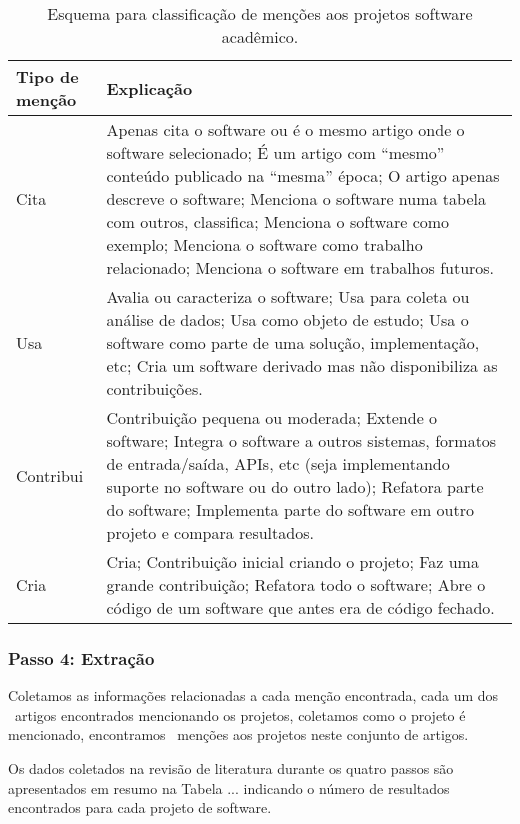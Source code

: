 \begin{table}[h]
\caption{Esquema para classificação de menções aos projetos software acadêmico.}
\centering
\begin{tabular}{ l p{10cm} }
  \hline
  Tipo de menção           & Explicação \\
  \hline
  Cita      & Apenas cita o software ou é o mesmo artigo onde o software selecionado; É um artigo com ``mesmo'' conteúdo publicado na ``mesma'' época; O artigo apenas descreve o software; Menciona o software numa tabela com outros, classifica; Menciona o software como exemplo; Menciona o software como trabalho relacionado; Menciona o software em trabalhos futuros. \\
  Usa       & Avalia ou caracteriza o software; Usa para coleta ou análise de dados; Usa como objeto de estudo; Usa o software como parte de uma solução, implementação, etc; Cria um software derivado mas não disponibiliza as contribuições. \\
  Contribui & Contribuição pequena ou moderada; Extende o software; Integra o software a outros sistemas, formatos de entrada/saída, APIs, etc (seja implementando suporte no software ou do outro lado); Refatora parte do software; Implementa parte do software em outro projeto e compara resultados. \\
  Cria      & Cria; Contribuição inicial criando o projeto; Faz uma grande contribuição; Refatora todo o software; Abre o código de um software que antes era de código fechado. \\
  \hline
\end{tabular}
\label{esquema-de-mencao}
\end{table}


\subsubsection{Passo 4: Extração}

Coletamos as informações relacionadas a cada menção encontrada, cada um dos
\ScreeningUniqueCount \ artigos encontrados mencionando os projetos, coletamos
como o projeto é mencionado, encontramos \ScreeningCount \ menções aos
projetos neste conjunto de artigos.

Os dados coletados na revisão de literatura durante os quatro passos são
apresentados em resumo na Tabela ... indicando o
número de resultados encontrados para cada projeto de software.
%

